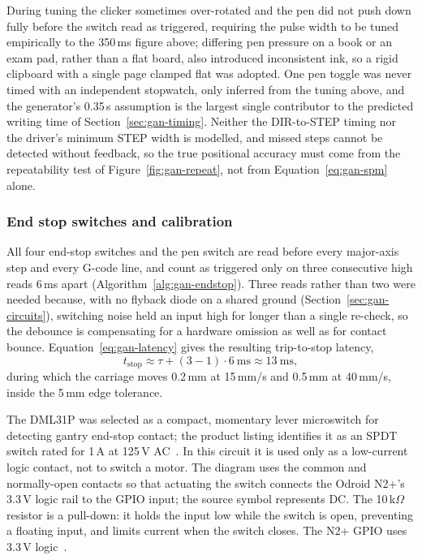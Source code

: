 During tuning the clicker sometimes over-rotated and the pen did not push down fully before the switch read as triggered, requiring the pulse width to be tuned empirically to the 350\,ms figure above; differing pen pressure on a book or an exam pad, rather than a flat board, also introduced inconsistent ink, so a rigid clipboard with a single page clamped flat was adopted. One pen toggle was never timed with an independent stopwatch, only inferred from the tuning above, and the generator's 0.35\,s assumption is the largest single contributor to the predicted writing time of Section~\ref{sec:gan-timing}. Neither the DIR-to-STEP timing nor the driver's minimum STEP width is modelled, and missed steps cannot be detected without feedback, so the true positional accuracy must come from the repeatability test of Figure~\ref{fig:gan-repeat}, not from Equation~\ref{eq:gan-spm} alone.


\subsubsection{End stop switches and calibration}
All four end-stop switches and the pen switch are read before every major-axis step and every G-code line, and count as triggered only on three consecutive high reads 6\,ms apart (Algorithm~\ref{alg:gan-endstop}). Three reads rather than two were needed because, with no flyback diode on a shared ground (Section~\ref{sec:gan-circuits}), switching noise held an input high for longer than a single re-check, so the debounce is compensating for a hardware omission as well as for contact bounce. Equation~\ref{eq:gan-latency} gives the resulting trip-to-stop latency,
\begin{equation}
t_{\mathrm{stop}}\approx\tau+(3-1)\cdot6\ \mathrm{ms}\approx13\ \mathrm{ms},
\label{eq:gan-latency}
\end{equation}
during which the carriage moves 0.2\,mm at 15\,mm/s and 0.5\,mm at 40\,mm/s, inside the 5\,mm edge tolerance.

The DML31P was selected as a compact, momentary lever microswitch for detecting gantry end-stop contact; the product listing identifies it as an SPDT switch rated for 1\,A at 125\,V AC~\cite{dml31p}. In this circuit it is used only as a low-current logic contact, not to switch a motor. The diagram uses the common and normally-open contacts so that actuating the switch connects the Odroid N2+'s 3.3\,V logic rail to the GPIO input; the source symbol represents DC. The 10\,k$\Omega$ resistor is a pull-down: it holds the input low while the switch is open, preventing a floating input, and limits current when the switch closes. The N2+ GPIO uses 3.3\,V logic~\cite{odroidn2ds}.

